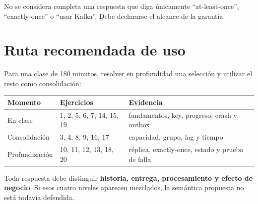 \documentclass[variant=guia,cover=institutional,mode=screen]{ua-engineering-v6-article}
\begin{document}
\begin{uawarn}
No se considera completa una respuesta que diga únicamente ``at-least-once'', ``exactly-once'' o ``usar Kafka''. Debe declararse el alcance de la garantía.
\end{uawarn}


\section{Ruta recomendada de uso}

Para una clase de 180 minutos, resolver en profundidad una selección y utilizar el resto como consolidación:

\begin{center}
\begin{tabular}{p{}p{}p{}}
\toprule
Momento & Ejercicios & Evidencia \\
\midrule
En clase & 1, 2, 5, 6, 7, 14, 15, 19 & fundamentos, key, progreso, crash y outbox \\
Consolidación & 3, 4, 8, 9, 16, 17 & capacidad, grupo, lag y tiempo \\
Profundización & 10, 11, 12, 13, 18, 20 & réplica, exactly-once, estado y prueba de falla \\
\bottomrule
\end{tabular}
\end{center}

Toda respuesta debe distinguir \textbf{historia, entrega, procesamiento y efecto de negocio}. Si esos cuatro niveles aparecen mezclados, la semántica propuesta no está todavía defendida.
\end{document}
